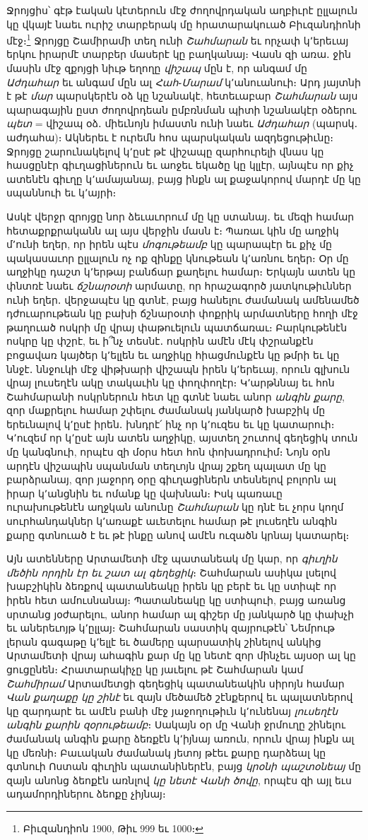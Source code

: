 \documentclass{article}
\begin{document}
{Ջրոյցիս՝ գէթ էական կէտերուն մէջ ժողովրդական աղբիւրէ ըլլալուն կը վկայէ նաեւ ուրիշ տարբերակ մը հրատարակուած Բիւզանդիոնի մէջ։\footnote{Բիւզանդիոն 1900, Թիւ 999 եւ 1000։} Ջրոյցը Շամիրամի տեղ ունի \emph{Շահմարան} եւ որչափ կ՚երեւայ երկու իրարմէ տարբեր մասերէ կը բաղկանայ։ Վասն զի առա․ ջին մասին մէջ զքոյցի նիւթ եղողը \emph{վիշապ} մըն է, որ անգամ մը \emph{Աժդահար} եւ անգամ մըն ալ \emph{Հահ}֊\emph{Մարամ} կ՚անուանուի։ Արդ յայտնի է թէ \emph{մար} պարսկերէն օձ կը նշանակէ, հետեւաբար \emph{Շահմարան} այս պարագային ըստ ժողովրդեան ըմբռնման պիտի նշանակէր օձերու \emph{պետ} = վիշապ օձ․ միեւնոյն իմաստն ունի նաեւ \emph{Աժդահար} (պարսկ․ աժդահա)։ Ակներեւ է ուրեմն հոս պարսկական ազդեցութիւնը։ Ջրոյցը շարունակելով կ՚ըսէ թէ վիշապը զարհուրելի վնաս կը հասցընէր գիւղացիներուն եւ աոջեւ եկածը կը կլլէր, այնպէս որ քիչ ատենէն գիւղը կ՚ամայանայ, բայց ինքն ալ քաջակորով մարդէ մը կը սպաննուի եւ կ՚այրի։

Ասկէ վերջր զրոյցը նոր ձեւաւորում մը կը ստանայ․ եւ մեզի համար հետաքրքրականն ալ այս վերջին մասն է։ Պառաւ կին մը աղջիկ մ՚ունի եղեր, որ իրեն պէս \emph{մոգութեամբ} կը պարապէր եւ քիչ մը պակասաւոր ըլլալուն ոչ ոք զինքը կնութեան կ՚առնու եղեր։ Օր մը աղջիկը դաշտ կ՚երթայ բանճար քաղելու համար։ Երկայն ատեն կը փնտռէ նաեւ \emph{ճշնարօտի} արմատը, որ հրաշագործ յատկութիւններ ունի եղեր․ վերջապէս կը գտնէ, բայց հանելու ժամանակ ամենամեծ դժուարութեան կը բախի ճշնարօտի փոքրիկ արմատները հողի մէջ թաղուած ոսկրի մը վրայ փաթուելուն պատճառաւ։ Բարկութենէն ոսկրը կը փշրէ, եւ ի՞նչ տեսնէ․ ոսկրին ամէն մէկ փշրանքէն բոցավառ կայծեր կ՚ելլեն եւ աղջիկը հիացմունքէն կը թմրի եւ կը ննջէ․ ննջուկի մէջ վիթխարի վիշապն իրեն կ՚երեւայ, որուն գլխուն վրայ լուսեղէն ակը տակաւին կը փողփողէր։ Կ՚արթննայ եւ հոն Շահմարանի ոսկրներուն հետ կը գտնէ նաեւ անոր \emph{անգին քարը}, զոր մաքրելու համար շփելու ժամանակ յանկարծ խաբշիկ մը երեւնալով կ՚ըսէ իրեն․ խնդրէ՛ ինչ որ կ՚ուզես եւ կը կատարուի։ Կ՚ուզեմ որ կ՚ըսէ այն ատեն աղջիկը, այստեղ շուտով գեղեցիկ տուն մը կանգնուի, որպէս զի մօրս հետ հոն փոխադրուիմ։ Նոյն օրն արդէն վիշապին սպանման տեղւոյն վրայ շքեղ պալատ մը կը բարձրանայ, զոր յաջորդ օրը գիւղացիներն տեսնելով բոլորն ալ իրար կ՚անցնին եւ ոմանք կը վախնան։ Իսկ պառաւը ուրախութենէն աղջկան անունը \emph{Շահմարան} կը դնէ եւ չորս կողմ սուրհանդակներ կ՚առաքէ աւետելու համար թէ լուսեղէն անգին քարը գտնուած է եւ թէ ինքը անով ամէն ուզածն կրնայ կատարել։

Այն ատենները Արտամետի մէջ պատանեակ մը կար, որ \emph{գիւղին մեծին որդին էր եւ շատ ալ գեղեցիկ}։ Շահմարան ասիկա լսելով խաբշիկին ձեռքով պատանեակը իրեն կը բերէ եւ կը ստիպէ որ իրեն հետ ամուսնանայ։ Պատանեակը կը ստիպուի, բայց առանց սրտանց յօժարելու, անոր համար ալ գիշեր մը յանկարծ կը փախչի եւ աներեւոյթ կ՚ըլլայ։ Շահմարան սաստիկ զայրութէն՝ Նեմրութ լերան գագաթը կ՚ելլէ եւ ծամերը պարսատիկ շինելով անկից Արտամետի վրայ ահագին քար մը կը նետէ զոր մինչեւ այսօր ալ կը ցուցընեն։ Հրատարակիչը կը յաւելու թէ Շահմարան կամ \emph{Շահմիրամ} Արտամետցի գեղեցիկ պատանեակին սիրոյն համար \emph{Վան քաղաքը կը շինէ} եւ զայն մեծամեծ շէնքերով եւ պալատներով կը զարդարէ եւ ամէն բանի մէջ յաջողութիւն կ՚ունենայ \emph{լուսեղէն անգին քարին զօրութեամբ}։ Սակայն օր մը Վանի ջրմուղը շինելու ժամանակ անգին քարը ձեռքէն կ՚իյնայ առուն, որուն վրայ ինքն ալ կը մեռնի։ Բաւական ժամանակ յետոյ թէեւ քարը դարձեալ կը գտնուի Ոստան գիւղին պատանիներէն, բայց \emph{կրօնի պաշտօնեայ} մը զայն անոնց ձեոքէն առնլով \emph{կը նետէ Վանի ծովը}, որպէս զի այլ եւս ադամորդիներու ձեոքը չիյնայ։

}
\end{document}
